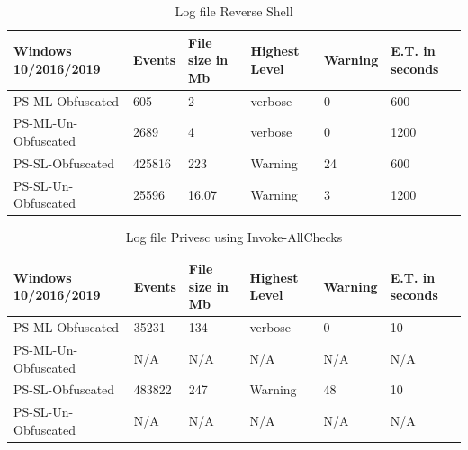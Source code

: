 \documentclass{article}%
\begin{document}
\begin{table}[]
\caption {Log file Reverse Shell}
\begin{center}
\begin{tabular}{|l|l|l|l|l|l|}\hline
Windows 10/2016/2019 & Events & File size in Mb & Highest Level & Warning & E.T. in seconds \\\hline
PS-ML-Obfuscated     & 605    & 2               & verbose       & 0       & 600             \\\hline
PS-ML-Un-Obfuscated  & 2689   & 4               & verbose       & 0       & 1200            \\\hline
PS-SL-Obfuscated     & 425816 & 223             & Warning       & 24      & 600             \\\hline
PS-SL-Un-Obfuscated  & 25596  & 16.07           & Warning       & 3       & 1200           	\\\hline
\end{tabular}
\end{center}
\end{table}
\begin{table}[]
\caption {Log file Privesc using Invoke-AllChecks}
\begin{tabular}{|l|l|l|l|l|l|}\hline
Windows 10/2016/2019 & Events & File size in Mb & Highest Level & Warning & E.T. in seconds \\\hline
PS-ML-Obfuscated     & 35231    & 134               & verbose       & 0       & 10              \\\hline
PS-ML-Un-Obfuscated  & N/A    & N/A               & N/A       & N/A       & N/A              \\\hline
PS-SL-Obfuscated     & 483822    & 247               & Warning       & 48      & 10              \\\hline
PS-SL-Un-Obfuscated  & N/A  & N/A           & N/A       & N/A       & N/A           	\\\hline
\end{tabular}
\end{table}
\newpage
\end{document}
